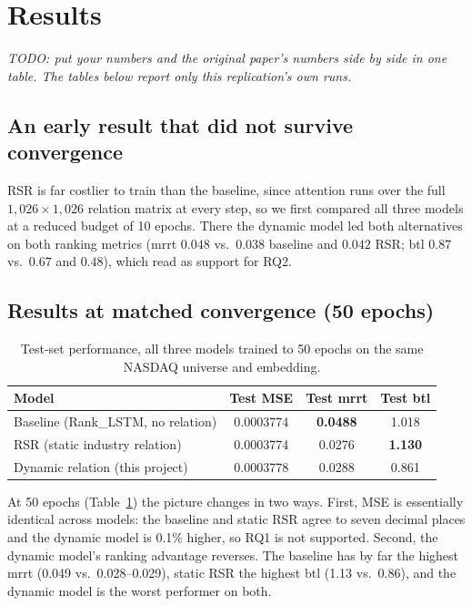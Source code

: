 \documentclass[12pt]{article}
\newcommand{\inst}[1]{\textit{#1}}
\begin{document}
\section{Results}
\label{sec:results}

\inst{TODO: put your numbers and the original paper's numbers side by side in one table. The
tables below report only this replication's own runs.}

\subsection{An early result that did not survive convergence}

RSR is far costlier to train than the baseline, since attention runs over the full
$1{,}026\times1{,}026$ relation matrix at every step, so we first compared all three models at a
reduced budget of 10 epochs. There the dynamic model led both alternatives on both ranking metrics
(mrrt $0.048$ vs.\ $0.038$ baseline and $0.042$ RSR; btl $0.87$ vs.\ $0.67$ and $0.48$), which
read as support for RQ2.

\subsection{Results at matched convergence (50 epochs)}

\begin{table}[h]
\centering
\caption{Test-set performance, all three models trained to 50 epochs on the same NASDAQ universe
and embedding.}
\label{tab:results50}
\begin{tabular}{lccc}
\toprule
Model & Test MSE & Test mrrt & Test btl \\
\midrule
Baseline (Rank\_LSTM, no relation) & 0.0003774 & \textbf{0.0488} & 1.018 \\
RSR (static industry relation) & 0.0003774 & 0.0276 & \textbf{1.130} \\
Dynamic relation (this project) & 0.0003778 & 0.0288 & 0.861 \\
\bottomrule
\end{tabular}
\end{table}

At 50 epochs (Table~\ref{tab:results50}) the picture changes in two ways. First, MSE is essentially
identical across models: the baseline and static RSR agree to seven decimal places and the dynamic
model is 0.1\% higher, so RQ1 is not supported. Second, the dynamic model's ranking advantage
reverses. The baseline has by far the highest mrrt (0.049 vs.\ 0.028--0.029), static RSR the
highest btl (1.13 vs.\ 0.86), and the dynamic model is the worst performer on both.
\end{document}
